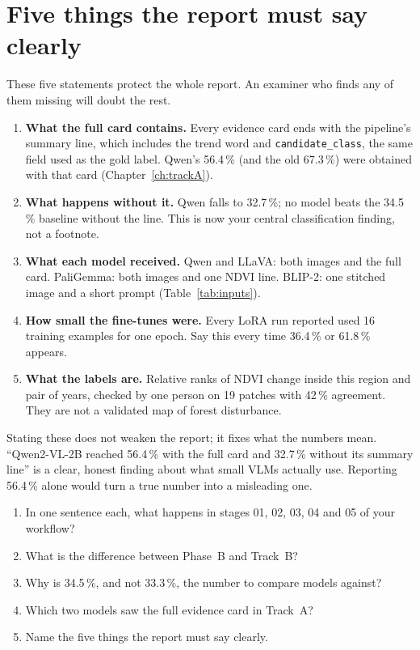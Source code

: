 \section{Five things the report must say clearly}

These five statements protect the whole report. An examiner who finds any of them missing will doubt the rest.

\begin{enumerate}
  \item \textbf{What the full card contains.} Every evidence card ends with the pipeline's summary line, which includes the trend word and \texttt{candidate\_class}, the same field used as the gold label. Qwen's 56.4\,\% (and the old 67.3\,\%) were obtained with that card (Chapter~\ref{ch:trackA}).
  \item \textbf{What happens without it.} Qwen falls to 32.7\,\%; no model beats the 34.5\,\% baseline without the line. This is now your central classification finding, not a footnote.
  \item \textbf{What each model received.} Qwen and LLaVA: both images and the full card. PaliGemma: both images and one NDVI line. BLIP-2: one stitched image and a short prompt (Table~\ref{tab:inputs}).
  \item \textbf{How small the fine-tunes were.} Every LoRA run reported used 16 training examples for one epoch. Say this every time 36.4\,\% or 61.8\,\% appears.
  \item \textbf{What the labels are.} Relative ranks of NDVI change inside this region and pair of years, checked by one person on 19 patches with 42\,\% agreement. They are not a validated map of forest disturbance.
\end{enumerate}

\begin{whybox}
Stating these does not weaken the report; it fixes what the numbers mean. ``Qwen2-VL-2B reached 56.4\,\% with the full card and 32.7\,\% without its summary line'' is a clear, honest finding about what small VLMs actually use. Reporting 56.4\,\% alone would turn a true number into a misleading one.
\end{whybox}

\begin{selfcheck}
\begin{enumerate}
  \item In one sentence each, what happens in stages 01, 02, 03, 04 and 05 of your workflow?
  \item What is the difference between Phase~B and Track~B?
  \item Why is 34.5\,\%, and not 33.3\,\%, the number to compare models against?
  \item Which two models saw the full evidence card in Track~A?
  \item Name the five things the report must say clearly.
\end{enumerate}
\end{selfcheck}
